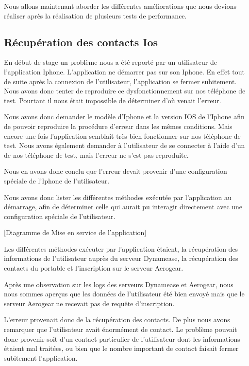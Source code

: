 Nous allons maintenant aborder les différentes améliorations que nous devions réaliser après la réalisation de plusieurs tests de performance.

\subsection{Récupération des contacts Ios}

En début de stage un problème nous a été reporté par un utilisateur de l'application Iphone. L'application ne démarrer pas sur son Iphone. En effet tout de suite après la connexion de l'utilisateur, l'application se fermer subitement. Nous avons donc tenter de reproduire ce dysfonctionnement sur nos téléphone de test. Pourtant il nous était impossible de déterminer d'où venait l'erreur.

Nous avons donc demander le modèle d'Iphone et la version IOS de l'Iphone afin de pouvoir reproduire la procédure d'erreur dans les mêmes conditions. Mais encore une fois l'application semblait très bien fonctionner sur nos téléphone de test. Nous avons également demander à l'utilisateur de se connecter à l'aide d'un de nos téléphone de test, mais l'erreur ne s'est pas reproduite.

Nous en avons donc conclu que l'erreur devait provenir d'une configuration spéciale de l'Iphone de l'utilisateur.

Nous avons donc lister les différentes méthodes exécutée par l'application au démarrage, afin de déterminer celle qui aurait pu interagir directement avec une configuration spéciale de l'utilisateur.

[Diagramme de Mise en service de l'application]

Les différentes méthodes exécuter par l'application étaient, la récupération des informations de l'utilisateur auprès du serveur Dynamease, la récupération des contacts du portable et l'inscription sur le serveur Aerogear.

Après une observation sur les logs des serveurs Dynamease et Aerogear, nous nous sommes aperçus que les données de l'utilisateur été bien envoyé mais que le serveur Aerogear ne recevait pas de requête d'inscription.

L'erreur provenait donc de la récupération des contacts. De plus nous avons remarquer que l'utilisateur avait énormément de contact. Le problème pouvait donc provenir soit d'un contact particulier de l'utilisateur dont les informations étaient mal traitées, ou bien que le nombre important de contact faisait fermer subitement l'application.

